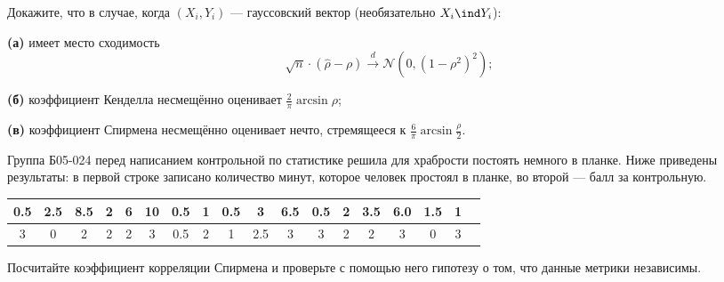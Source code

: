 \begin{problem}
	Докажите, что в случае, когда $(X_i, Y_i)$ --- гауссовский вектор (необязательно $X_i \ind Y_i$):
	
	\textbf{(а)} имеет место сходимость
\[
\sqrt{n} \cdot (\widehat\rho - \rho) \stackrel{d}{\to} \mathcal{N}(0, (1-\rho^2)^2);
\]

	\textbf{(б)} коэффициент Кенделла несмещённо оценивает $\frac{2}{\pi} \arcsin \rho$;

	\textbf{(в)} коэффициент Спирмена несмещённо оценивает нечто, стремящееся к $\frac{6}{\pi} \arcsin \frac{\rho}{2}$.
\end{problem}

\begin{problem}
	Группа Б05-024 перед написанием контрольной по статистике решила для храбрости постоять немного в планке. Ниже приведены результаты: в первой строке записано количество минут, которое человек простоял в планке, во второй --- балл за контрольную.

\begin{center}
	\begin{tabular}{|c|c|c|c|c|c|c|c|c|c|c|c|c|c|c|c|c|c|}
	\hline
	0.5 & 2.5 & 8.5 & 2 & 6 & 10 & 0.5 & 1 & 0.5 & 3 & 6.5 & 0.5 & 2 & 3.5 & 6.0 & 1.5 & 1\\
	\hline
	3 & 0 & 2 & 2 & 2 & 3 & 0.5 & 2 & 1 & 2.5 & 3 & 3 & 2 & 2 & 3 & 0 & 3\\
	\hline
	\end{tabular}
\end{center}

Посчитайте коэффициент корреляции Спирмена и проверьте с помощью него гипотезу о том, что данные метрики независимы.
\end{problem}


